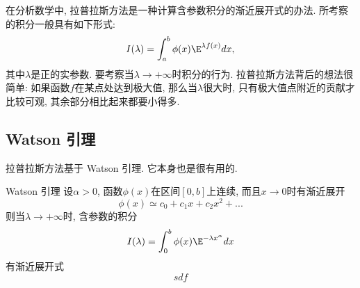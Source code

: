 

在分析数学中, 拉普拉斯方法是一种计算含参数积分的渐近展开式的办法. 所考察的积分一般具有如下形式:
\begin{equation}\label{LapAsm_eq1}
I(\lambda)=\int_a^b \phi(x)\E^{\lambda f(x)}dx,
\end{equation}
其中$\lambda$是正的实参数. 要考察当$\lambda\to+\infty$时积分的行为. 拉普拉斯方法背后的想法很简单: 如果函数$f$在某点处达到极大值, 那么当$\lambda$很大时, 只有极大值点附近的贡献才比较可观, 其余部分相比起来都要小得多.

\subsection{Watson 引理}
拉普拉斯方法基于 Watson 引理. 它本身也是很有用的.

\begin{lemma}{Watson 引理}
设$\alpha>0$, 函数$\phi(x)$在区间$[0,b]$上连续, 而且$x\to0$时有渐近展开
$$
\phi(x)\simeq c_0+c_1x+c_2x^2+...
$$
则当$\lambda\to+\infty$时, 含参数的积分
$$
I(\lambda)=\int_0^b \phi(x)\E^{-\lambda x^\alpha}dx
$$
有渐近展开式
$$
sdf
$$
\end{lemma}

